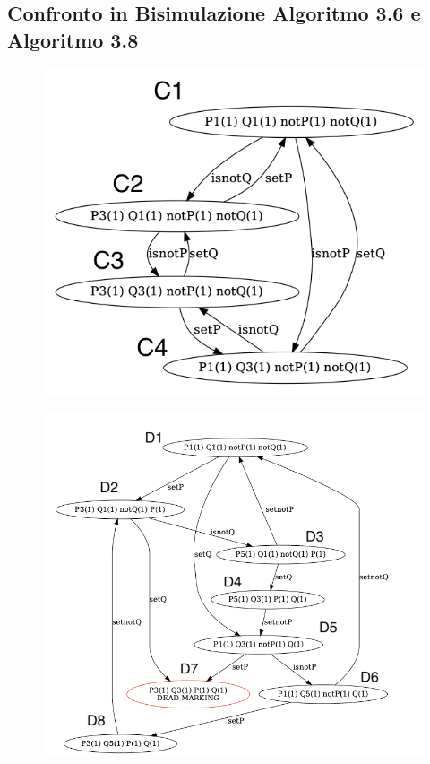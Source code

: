 \documentclass{article}
\begin{document}
\subsection{Confronto in Bisimulazione Algoritmo 3.6 e Algoritmo 3.8}
\begin{figure}[h] 
\centering
\includegraphics[scale=0.36]{BIS3.6.png}
\end{figure}
\begin{figure}[h] 
\centering
\includegraphics[scale=0.36]{Bis3-8.png}
\end{figure}
\end{document}
